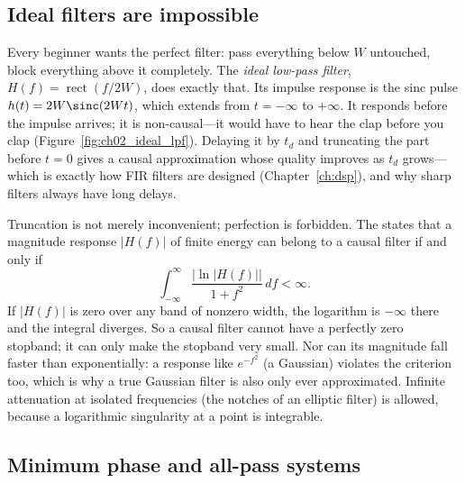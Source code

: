 \subsection{Ideal filters are impossible}

Every beginner wants the perfect filter: pass everything below $W$ untouched, block everything above
it completely. The \emph{ideal low-pass filter}, $H(f)=\operatorname{rect}(f/2W)$, does exactly that.
Its impulse response is the sinc pulse $h(t)=2W\sinc(2Wt)$, which extends from $t=-\infty$ to
$+\infty$. It responds before the impulse arrives; it is non-causal---it would have to hear the clap
before you clap (Figure~\ref{fig:ch02_ideal_lpf}). Delaying it by $t_d$ and truncating the part
before $t=0$ gives a causal approximation whose quality improves as $t_d$ grows---which is exactly
how FIR filters are designed (Chapter~\ref{ch:dsp}), and why sharp filters always have long delays.


Truncation is not merely inconvenient; perfection is forbidden. The 
states that a magnitude response $|H(f)|$ of finite energy can belong to a causal filter if and
only if
\begin{equation}
\int_{-\infty}^{\infty}\frac{\big|\ln|H(f)|\big|}{1+f^2}\,df<\infty .
\label{eq:ch02:paleywiener}
\end{equation}
If $|H(f)|$ is zero over any band of nonzero width, the logarithm is $-\infty$ there and the integral
diverges. So a causal filter cannot have a perfectly zero stopband; it can only make the stopband
very small. Nor can its magnitude fall faster than exponentially: a response like
$e^{-f^2}$ (a Gaussian) violates the criterion too, which is why a true Gaussian filter is also only
ever approximated. Infinite attenuation at isolated frequencies (the notches of an elliptic filter)
is allowed, because a logarithmic singularity at a point is integrable.

\subsection{Minimum phase and all-pass systems}

